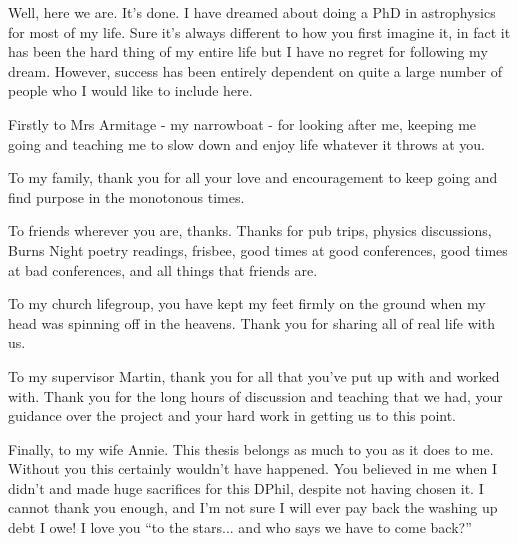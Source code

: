 \begin{acknowledgements}
Well, here we are. It's done. I have dreamed about doing a PhD in astrophysics for most of my life. Sure it's always different to how you first imagine it, in fact it has been the hard thing of my entire life but I have no regret for following my dream. However, success has been entirely dependent on quite a large number of people who I would like to include here. 

Firstly to Mrs Armitage - my narrowboat - for looking after me, keeping me going and teaching me to slow down and enjoy life whatever it throws at you. 

To my family, thank you for all your love and encouragement to keep going and find purpose in the monotonous times. 

To friends wherever you are, thanks. Thanks for pub trips, physics discussions, Burns Night poetry readings, frisbee, good times at good conferences, good times at bad conferences, and all things that friends are.

To my church lifegroup, you have kept my feet firmly on the ground when my head was spinning off in the heavens. Thank you for sharing all of real life with us. 

To my supervisor Martin, thank you for all that you've put up with and worked with. Thank you for the long hours of discussion and teaching that we had, your guidance over the project and your hard work in getting us to this point. 

Finally, to my wife Annie. This thesis belongs as much to you as it does to me. Without you this certainly wouldn't have happened. You believed in me when I didn't and made huge sacrifices for this DPhil, despite not having chosen it. I cannot thank you enough, and I'm not sure I will ever pay back the washing up debt I owe! I love you ``to the stars... and who says we have to come back?''
\end{acknowledgements}
